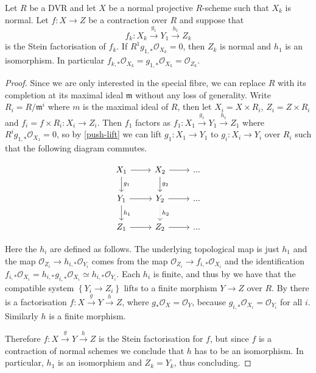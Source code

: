 \documentclass[a4paper,12pt]{book}
\newcommand{\cO}{\mathcal{O}}
\newcommand{\ox}[1][X]{\mathcal{O}_{#1}}
\begin{document}
\begin{theorem}\label{adj-push}
	Let $R$ be a DVR and let $X$ be a normal projective $R$-scheme such that $X_{k}$ is normal. 
	Let $f \colon X \to Z$ be a contraction over $R$ and suppose that $$f_{k}\colon X_{k} \xrightarrow{g_{1}} Y_{1} \xrightarrow{h_{1}} Z_{k}$$ is the Stein factorisation of $f_{k}$. If $R^{1}g_{1,*} \ox[X_{k}]=0$, then $Z_k$ is normal and $h_{1}$ is an isomorphism. In particular $f_{k,*}\ox[X_{k}]=g_{1,*}\ox[X_{k}]=\ox[Z_{k}].$
\end{theorem}

\begin{proof}
	Since we are only interested in the special fibre, we can replace $R$ with its completion at its maximal ideal $\mathfrak{m}$ without any loss of generality.
	Write $R_{i}=R/\mathfrak{m}^{i}$ where $m$ is the maximal ideal of $R$, then let $X_{i}=X \times R_{i}$, $Z_{i}=Z\times R_{i}$ and $f_{i}=f\times R_{i}\colon X_{i} \to Z_{i}$.
	Then $f_{1}$ factors as $f_{1}\colon X_{1} \xrightarrow{g_{1}} Y_{1} \xrightarrow{h_{1}} Z_{1}$ where $R^{i}g_{1,*}\ox[X_{1}]=0$, so by \autoref{push-lift} we can lift $g_{1}\colon X_{1} \to Y_{1}$ to $g_{i}\colon X_{i} \to Y_{i}$ over $R_{i}$ such that the following diagram commutes.
	
	\[\begin{tikzcd}
	X_{1} \arrow[r] \arrow[d, "g_{1}"] & X_{2} \arrow[r] \arrow[d, "g_{2}"] & ... \\
	Y_{1} \arrow[r] \arrow[d, "h_{1}"] & Y_{2} \arrow[d, dotted, "h_{2}"] \arrow[r]  & ... \\
	Z_{1} \arrow[r]                    & Z_{2} \arrow[r]                    & ...
	\end{tikzcd}\]
	
	Here the $h_{i}$ are defined as follows. The underlying topological map is just $h_{1}$ and the map $\ox[Z_{i}] \to h_{i,*}\ox[Y_{i}]$ comes from the map ${\ox[Z_{i}] \to f_{i,*}\ox[X_{i}]}$ and the identification $f_{i,*}\ox[X_{i}]=h_{i,*}g_{i,*}\ox[X_{i}]\simeq h_{i,*}\ox[Y_{i}]$.
	Each $h_{i}$ is finite, and thus by
	\cite[\href{https://stacks.math.columbia.edu/tag/09ZT}{Tag 09ZT}]{stacks-project} we have that the compatible system $\left\{Y_{i} \to Z_i \right\}$ lifts to a finite morphism $Y \to Z$ over $R$. By \cite[\href{https://stacks.math.columbia.edu/tag/0A42}{Tag 0A42}]{stacks-project} there is a factorisation ${f\colon X \xrightarrow{g} Y \xrightarrow{h} Z}$, where $g_{*}\ox = \cO_Y$, because $g_{i,*}\cO_{X_i}=\cO_{Y_i}$ for all $i$. Similarly $h$ is a finite morphism. 
	
	Therefore $f \colon X \xrightarrow{g} Y \xrightarrow{h} Z$ is the Stein factorisation for $f$, but since $f$ is a contraction of normal schemes we conclude that $h$ has to be an isomorphism.
	In particular, $h_1$ is an isomorphism and $Z_{k}=Y_{k}$, thus concluding.
\end{proof}
\end{document}

